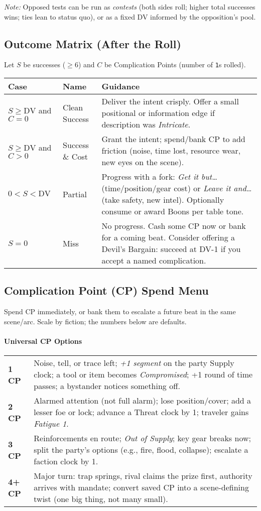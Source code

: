 \documentclass[12pt]{article}
\begin{document}
\smallskip
\noindent\emph{Note:} Opposed tests can be run as \emph{contests} (both sides roll; higher total successes wins; ties lean to status quo), or as a fixed DV informed by the opposition's pool.

\subsection{Outcome Matrix (After the Roll)}
Let $S$ be successes ($\ge 6$) and $C$ be Complication Points (number of \texttt{1}s rolled).

\begin{tabular}{@{}llp{9cm}@{}}
\toprule
\textbf{Case} & \textbf{Name} & \textbf{Guidance} \\
\midrule
$S \ge \mathrm{DV}$ and $C=0$ & Clean Success & Deliver the intent crisply. Offer a small positional or information edge if description was \emph{Intricate}. \\
$S \ge \mathrm{DV}$ and $C>0$ & Success \& Cost & Grant the intent; spend/bank CP to add friction (noise, time lost, resource wear, new eyes on the scene). \\
$0<S<\mathrm{DV}$ & Partial & Progress with a fork: \emph{Get it but…} (time/position/gear cost) or \emph{Leave it and…} (take safety, new intel). Optionally consume or award Boons per table tone. \\
$S=0$ & Miss & No progress. Cash some CP now or bank for a coming beat. Consider offering a Devil’s Bargain: succeed at DV-1 if you accept a named complication. \\
\bottomrule
\end{tabular}

\subsection{Complication Point (CP) Spend Menu}
\noindent Spend CP immediately, or bank them to escalate a future beat in the same scene/arc. Scale by fiction; the numbers below are defaults.

\paragraph{Universal CP Options}
\begin{tabular}{@{}lp{11cm}@{}}
\toprule
\textbf{1 CP} & Noise, tell, or trace left; \emph{+1 segment} on the party Supply clock; a tool or item becomes \emph{Compromised}; +1 round of time passes; a bystander notices something off. \\
\textbf{2 CP} & Alarmed attention (not full alarm); lose position/cover; add a lesser foe or lock; advance a Threat clock by 1; traveler gains \emph{Fatigue 1}. \\
\textbf{3 CP} & Reinforcements en route; \emph{Out of Supply}; key gear breaks now; split the party’s options (e.g., fire, flood, collapse); escalate a faction clock by 1. \\
\textbf{4+ CP} & Major turn: trap springs, rival claims the prize first, authority arrives with mandate; convert saved CP into a scene-defining twist (one big thing, not many small). \\
\bottomrule
\end{tabular}
\end{document}
